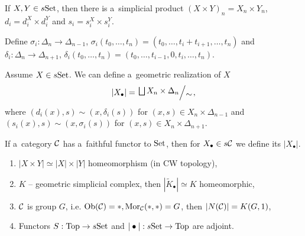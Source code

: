     \begin{remark}
        If $X, Y \in s\mathrm{Set}$, then there is a~simplicial product
        $(X \times Y)_n = X_n \times Y_n$,
        $d_i = d_i^X \times d_i^Y$
        and $s_i = s_i^X \times s_i^Y$.
    \end{remark}
    
    \begin{definition}
        Define $\sigma_i:\Delta_n \to \Delta_{n-1}$,
        $\sigma_i(t_0,\ldots, t_n) = (t_0,\ldots,t_i+t_{i+1},\ldots, t_n)$
        and $\delta_i:\Delta_n \to \Delta_{n+1}$,
        $\delta_i(t_0, \ldots, t_n) = (t_0, \ldots, t_{i-1},0,t_i,\ldots,t_n)$.
        
        Assume $X \in s\mathrm{Set}$. We can define a~geometric realization of $X$
        $$|X_\bullet| = \bigslant{\bigsqcup X_n \times \Delta_n}{\sim},$$
        where $(d_i(x),s) \sim (x,\delta_i(s))$ 
        for $(x,s) \in X_n \times \Delta_{n-1}$
        and $(s_i(x),s) \sim (x,\sigma_i(s))$
        for $(x,s) \in X_n \times \Delta_{n+1}$.
    \end{definition}
    
    \begin{remark}
        If a~category $\mathcal{C}$ has a~faithful functor to $\mathrm{Set}$,
        then for $X_\bullet \in s\mathcal{C}$ we define its $|X_\bullet|$.
    \end{remark}
    
    \begin{theorem}
        \begin{enumerate}
            \item $|X \times Y| \simeq |X|\times|Y|$ homeomorphism
            (in CW topology),
            \item $K$ -- geometric simplicial complex, then 
            $|\tilde{K}_\bullet| \simeq K$ homeomorphic,
            \item $\mathcal{C}$ is group $G$, 
            i.e. $\operatorname{Ob}(\mathcal{C}) = \ast, \operatorname{Mor}_{\mathcal{C}}(\ast,\ast) = G$,
            then $|N(\mathcal{C})| = K(G,1)$,
            \item Functors $S:\mathrm{Top}\to s\mathrm{Set}$ 
            and $|\bullet|:s\mathrm{Set} \to\mathrm{Top}$ are adjoint.
        \end{enumerate}
    \end{theorem}


 
 